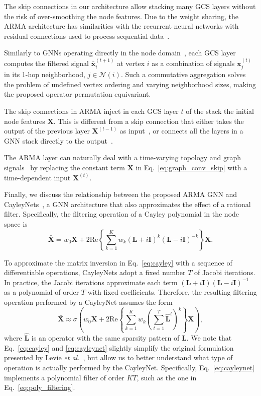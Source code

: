 \documentclass{article}
\def\X{{\mathbf X}}
\def\L{{\mathbf L}}
\def\I{{\mathbf I}}
\def\L{{\mathbf L}}
\begin{document}
The skip connections in our architecture allow stacking many GCS layers without the risk of over-smoothing the node features.
Due to the weight sharing, the ARMA architecture has similarities with the recurrent neural networks with residual connections used to process sequential data~\cite{wu2016google}.

Similarly to GNNs operating directly in the node domain~\cite{scarselli2009graph,gallicchio2010graph}, each GCS layer computes the filtered signal $\bar{\mathbf{x}}_i^{(t+1)}$ at vertex $i$ as a combination of signals $\mathbf{x}_j^{(t)}$ in its 1-hop neighborhood, $j \in \mathcal{N}(i)$. 
Such a commutative aggregation solves the problem of undefined vertex ordering and varying neighborhood sizes, making the proposed operator permutation equivariant.

The skip connections in ARMA inject in each GCS layer $t$ of the stack the initial node features $\X$. 
This is different from a skip connection that either takes the output of the previous layer $\X^{(t-1)}$ as input~\cite{pham2017column,hamilton2017inductive}, or connects all the layers in a GNN stack directly to the output~\cite{xu2018representation}.

The ARMA layer can naturally deal with a time-varying topology and graph signals~\cite{holme2015modern,grattarola2018learning} by replacing the constant term $\X$ in Eq.~\eqref{eq:graph_conv_skip} with a time-dependent input $\X^{(t)}$.

Finally, we discuss the relationship between the proposed ARMA GNN and CayleyNets~\cite{levie2017cayleynets}, a GNN architecture that also approximates the effect of a rational filter.
Specifically, the filtering operation of a Cayley polynomial in the node space is
\begin{equation}
    \label{eq:cayley}
    \bar \X = w_0\X + 2\text{Re} \left\{ \sum_{k=1}^{K} w_k  (\L + i\I)^k(\L - i\I)^{-k}  \right\} \X.
\end{equation}

To approximate the matrix inversion in Eq.~\eqref{eq:cayley} with a sequence of differentiable operations, CayleyNets adopt a fixed number $T$ of Jacobi iterations.
In practice, the Jacobi iterations approximate each term $(\L + i\I)(\L - i\I)^{-1}$ as a polynomial of order $T$ with fixed coefficients.
Therefore, the resulting filtering operation performed by a CayleyNet assumes the form
\begin{equation}
    \label{eq:cayleynet}
    \bar \X \approx \sigma \left( w_0\X +   2\text{Re} \left\{\sum_{k=1}^{K} w_k \left( \sum_{t=1}^{T} \hat{\L}^t \right)^k \right\} \X \right) ,
\end{equation}
where $\hat{\L}$ is an operator with the same sparsity pattern of $\L$.
We note that Eq.~\eqref{eq:cayley} and \eqref{eq:cayleynet} slightly simplify the original formulation presented by Levie \emph{et al.}~\cite{levie2017cayleynets}, but allow us to better understand what type of operation is actually performed by the CayleyNet.
Specifically, Eq.~\eqref{eq:cayleynet} implements a polynomial filter of order $KT$, such as the one in Eq.~\eqref{eq:poly_filtering}.
\end{document}
